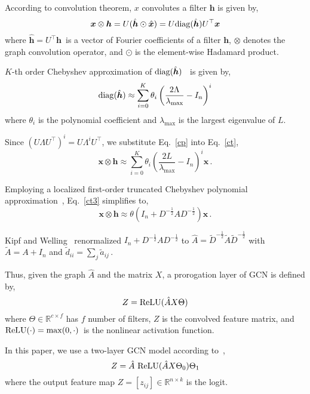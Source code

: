 \documentclass{article}
\newcommand{\x}{{\bm x}}
\newcommand{\h}{{\bm h}}
\newcommand{\T}{{\top}}
\begin{document}
According to convolution theorem, $x$ convolutes a filter $\h$ is given by,
\begin{equation}\label{ct}
\x\otimes \h=U(\hat{\h}\odot\hat{\x})=U{\rm diag}(\hat{\h})U^\T\x
\end{equation}
where $\hat{\h}=U^\T\h\,$ is a vector of Fourier coefficients of a filter $\h$, $\otimes$ denotes the graph convolution operator, and $\odot$ is the element-wise Hadamard product.

$K$-th order Chebyshev approximation of ${\rm diag}(\hat{\h})$~\cite{hammond2011wavelets} is given by,
\begin{equation}\label{cp}
{\rm diag}(\hat{\h})\approx\sum_{{i}=0}^{K}\theta_{i}\left(\frac{ 2\Lambda}{\lambda_{\max}}-I_n\right)^{i}
\end{equation}
where $\theta_{i}$ is the polynomial coefficient and $\lambda_{\max}$ is the largest eigenvalue of $L$.

Since $(U\Lambda U^\T)^{i}=U\Lambda^{i} U^\T$, we substitute Eq.~\eqref{cp} into Eq.~\eqref{ct},
\begin{equation}\label{ct3}
\x\otimes \h\approx\sum_{{i}=0}^{K}\theta_{i} \left(\frac{ 2L}{\lambda_{\max}}-I_n\right)^{i}\x\,.
\end{equation}


Employing a localized first-order truncated Chebyshev polynomial approximation~\cite{defferrard2016convolutional,kipf2016semi}, Eq.~\eqref{ct3} simplifies to,
\begin{equation}\label{ct4}
\x\otimes \h\approx\theta(I_n+D^{-\frac{1}{2}}AD^{-\frac{1}{2}})\x\,.
\end{equation}

Kipf and Welling~\cite{kipf2016semi} renormalized $I_n+D^{-\frac{1}{2}}AD^{-\frac{1}{2}}$ to $\hat{A}=\tilde{D}^{-\frac{1}{2}}\tilde{A}\tilde{D}^{-\frac{1}{2}}$ with $\tilde{A}=A+I_n$ and $\tilde{d}_{ii}=\sum_j\tilde{a}_{ij}\,$.

Thus, given the graph $\hat{A}$ and the matrix $X$, a prorogation layer of GCN is defined by,
\begin{equation}\label{layer}
Z = {\rm ReLU}(\hat{A}X\Theta)
\end{equation}
where $\Theta\in \mathbb{R}^{c\times f}$ has $f$ number of filters, $Z$ is the convolved feature matrix, and ${\rm ReLU}(\cdot) = \max(0, \cdot)\,$ is the nonlinear activation function.

In this paper, we use a two-layer GCN model according to~\cite{kipf2016semi},
\begin{equation}\label{gcn1}
Z = \hat{A}~{\rm ReLU}(\hat{A}X\Theta_0)\Theta_1
\end{equation}
where the output feature map $Z=[z_{ij}]\in\mathbb{R}^{n\times k}$ is the logit.
\end{document}
